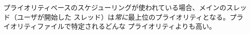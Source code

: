 \documentclass[\pformat,12pt]{jarticle}
\newcommand{\vdmslpp}{VDM++}
\newcommand{\Toolbox}{Toolbox}
\newcommand{\guicmd}[1]{{\gt #1}}
\begin{document}
プライオリティベースのスケジューリングが使われている場合、メインのスレッド（ユーザが開始した
スレッド）は\textit{常に}最上位のプライオリティとなる。プライオリティファイルで特定されるどんな
プライオリティよりも高い。 



% 
%






\end{document}
